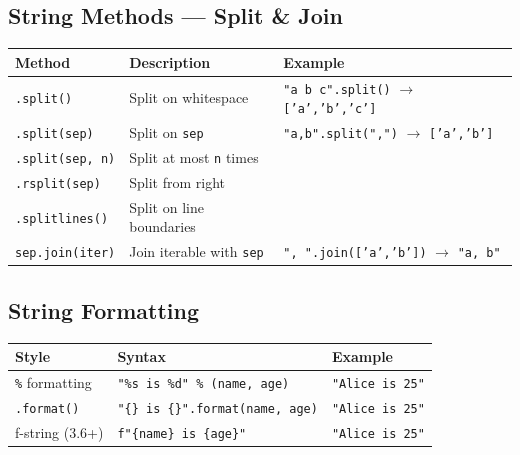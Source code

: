 \documentclass[oneside]{book}
\begin{document}
\subsection*{String Methods — Split \& Join}

\begin{center}
\begin{tabularx}{\linewidth}{lXl}
\toprule
\textbf{Method} & \textbf{Description} & \textbf{Example} \\
\midrule
\texttt{.split()}           & Split on whitespace              & \texttt{"a b c".split()} $\to$ \texttt{['a','b','c']} \\
\texttt{.split(sep)}        & Split on \texttt{sep}            & \texttt{"a,b".split(",")} $\to$ \texttt{['a','b']} \\
\texttt{.split(sep, n)}     & Split at most \texttt{n} times   & \\
\texttt{.rsplit(sep)}       & Split from right                 & \\
\texttt{.splitlines()}      & Split on line boundaries         & \\
\texttt{sep.join(iter)}     & Join iterable with \texttt{sep}  & \texttt{", ".join(['a','b'])} $\to$ \texttt{"a, b"} \\
\bottomrule
\end{tabularx}
\end{center}

\subsection*{String Formatting}

\begin{center}
\begin{tabularx}{\linewidth}{llX}
\toprule
\textbf{Style} & \textbf{Syntax} & \textbf{Example} \\
\midrule
\texttt{\%} formatting  & \texttt{"\%s is \%d" \% (name, age)}      & \texttt{"Alice is 25"} \\
\texttt{.format()}      & \texttt{"\{\} is \{\}".format(name, age)} & \texttt{"Alice is 25"} \\
f-string (3.6+)         & \texttt{f"\{name\} is \{age\}"}            & \texttt{"Alice is 25"} \\
\bottomrule
\end{tabularx}
\end{center}
\end{document}
